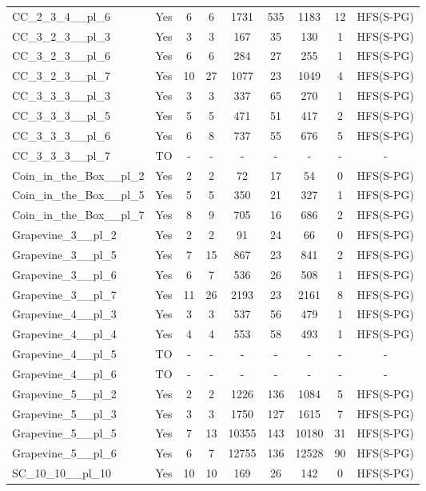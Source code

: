 \documentclass{article}
\begin{document}
\begin{tabular}{lcccccccc}
CC\_2\_3\_4\_\_pl\_6 & Yes & 6 & 6 & 1731 & 535 & 1183 & 12 & HFS(S-PG) \\
CC\_3\_2\_3\_\_pl\_3 & Yes & 3 & 3 & 167 & 35 & 130 & 1 & HFS(S-PG) \\
CC\_3\_2\_3\_\_pl\_6 & Yes & 6 & 6 & 284 & 27 & 255 & 1 & HFS(S-PG) \\
CC\_3\_2\_3\_\_pl\_7 & Yes & 10 & 27 & 1077 & 23 & 1049 & 4 & HFS(S-PG) \\
CC\_3\_3\_3\_\_pl\_3 & Yes & 3 & 3 & 337 & 65 & 270 & 1 & HFS(S-PG) \\
CC\_3\_3\_3\_\_pl\_5 & Yes & 5 & 5 & 471 & 51 & 417 & 2 & HFS(S-PG) \\
CC\_3\_3\_3\_\_pl\_6 & Yes & 6 & 8 & 737 & 55 & 676 & 5 & HFS(S-PG) \\
CC\_3\_3\_3\_\_pl\_7 & TO & - & - & - & - & - & - & - \\
Coin\_in\_the\_Box\_\_pl\_2 & Yes & 2 & 2 & 72 & 17 & 54 & 0 & HFS(S-PG) \\
Coin\_in\_the\_Box\_\_pl\_5 & Yes & 5 & 5 & 350 & 21 & 327 & 1 & HFS(S-PG) \\
Coin\_in\_the\_Box\_\_pl\_7 & Yes & 8 & 9 & 705 & 16 & 686 & 2 & HFS(S-PG) \\
Grapevine\_3\_\_pl\_2 & Yes & 2 & 2 & 91 & 24 & 66 & 0 & HFS(S-PG) \\
Grapevine\_3\_\_pl\_5 & Yes & 7 & 15 & 867 & 23 & 841 & 2 & HFS(S-PG) \\
Grapevine\_3\_\_pl\_6 & Yes & 6 & 7 & 536 & 26 & 508 & 1 & HFS(S-PG) \\
Grapevine\_3\_\_pl\_7 & Yes & 11 & 26 & 2193 & 23 & 2161 & 8 & HFS(S-PG) \\
Grapevine\_4\_\_pl\_3 & Yes & 3 & 3 & 537 & 56 & 479 & 1 & HFS(S-PG) \\
Grapevine\_4\_\_pl\_4 & Yes & 4 & 4 & 553 & 58 & 493 & 1 & HFS(S-PG) \\
Grapevine\_4\_\_pl\_5 & TO & - & - & - & - & - & - & - \\
Grapevine\_4\_\_pl\_6 & TO & - & - & - & - & - & - & - \\
Grapevine\_5\_\_pl\_2 & Yes & 2 & 2 & 1226 & 136 & 1084 & 5 & HFS(S-PG) \\
Grapevine\_5\_\_pl\_3 & Yes & 3 & 3 & 1750 & 127 & 1615 & 7 & HFS(S-PG) \\
Grapevine\_5\_\_pl\_5 & Yes & 7 & 13 & 10355 & 143 & 10180 & 31 & HFS(S-PG) \\
Grapevine\_5\_\_pl\_6 & Yes & 6 & 7 & 12755 & 136 & 12528 & 90 & HFS(S-PG) \\
SC\_10\_10\_\_pl\_10 & Yes & 10 & 10 & 169 & 26 & 142 & 0 & HFS(S-PG) \\

\end{tabular}
\end{document}
